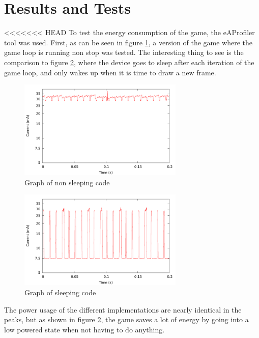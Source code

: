 \section{Results and Tests}
<<<<<<< HEAD
To test the energy consumption of the game, the eAProfiler tool was used. First,
as can be seen in figure \ref{fig:nosleep}, a version of the game where the game loop
is running non stop was tested. The interesting thing to see is the comparison
to figure \ref{fig:sleep}, where the device goes to sleep after each iteration
of the game loop, and only wakes up when it is time to draw a new frame.

\begin{figure}[H]
\centering
\includegraphics[width=0.7\textwidth]{figures/nosleep.pdf}
\caption{Graph of non sleeping code}
\label{fig:nosleep}
\end{figure}

\begin{figure}[H]
\centering
\includegraphics[width=0.7\textwidth]{figures/sleep.pdf}
\caption{Graph of sleeping code}
\label{fig:sleep}
\end{figure}

The power usage of the different implementations are nearly identical in the
peaks, but as shown in figure \ref{fig:sleep}, the game saves a lot of energy by
going into a low powered state when not having to do anything.

